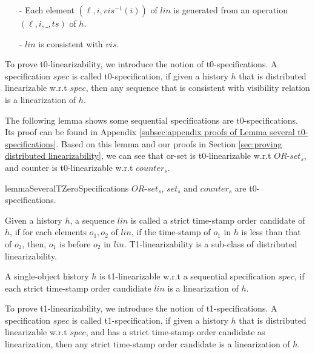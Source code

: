{\begin{definition}[t0-linearizability]
\begin{itemize}
\setlength{\itemsep}{0.5pt}
\item[-] Each element $(\ell,i,\mathit{vis}^{-1}(i))$ of $\mathit{lin}$ is generated from an operation $(\ell,i,\_,\mathit{ts})$ of $h$.

\item[-] $\mathit{lin}$ is consistent with $\mathit{vis}$.
\end{itemize}
\end{definition}

To prove t0-linearizability, we introduce the notion of t0-specifications. A specification $\mathit{spec}$ is called t0-specification, if given a history $h$ that is distributed linearizable w.r.t $\mathit{spec}$, then any sequence that is consistent with visibility relation is a linearization of $h$.

The following lemma shows some sequential specifications are t0-specifications. Its proof can be found in Appendix \ref{subsec:appendix proofs of Lemma several t0-specifications}. Based on this lemma and our proofs in Section \ref{sec:proving distributed linearizability}, we can see that or-set is t0-linearizable w.r.t $\mathit{OR}$-$\mathit{set}_s$, and counter is t0-linearizable w.r.t $\mathit{counter}_s$.

\begin{restatable}{lemma}{SeveralTZeroSpecifications}
\label{lemma:several t0-specifications}
$\mathit{OR}$-$\mathit{set}_s$, $\mathit{set}_s$ and $\mathit{counter}_s$ are t0-specifications.
\end{restatable}



Given a history $h$, a sequence $\mathit{lin}$ is called a strict time-stamp order candidate of $h$, if for each elements $o_1,o_2$ of $\mathit{lin}$, if the time-stamp of $o_1$ in $h$ is less than that of $o_2$, then, $o_1$ is before $o_2$ in $\mathit{lin}$. T1-linearizability is a sub-class of distributed linearizability.

\begin{definition}[t1-linearizability]
\label{definition:t1-ilnearizability}
A single-object history $h$ is t1-linearizable w.r.t a sequential specification $\mathit{spec}$, if each strict time-stamp order candidiate $\mathit{lin}$ is a linearization of $h$.
\end{definition}

To prove t1-linearizability, we introduce the notion of t1-specifications. A specification $\mathit{spec}$ is called t1-specification, if given a history $h$ that is distributed linearizable w.r.t $\mathit{spec}$, and has a strict time-stamp order candidate as linearization, then any strict time-stamp order candidate is a linearization of $h$.

}
